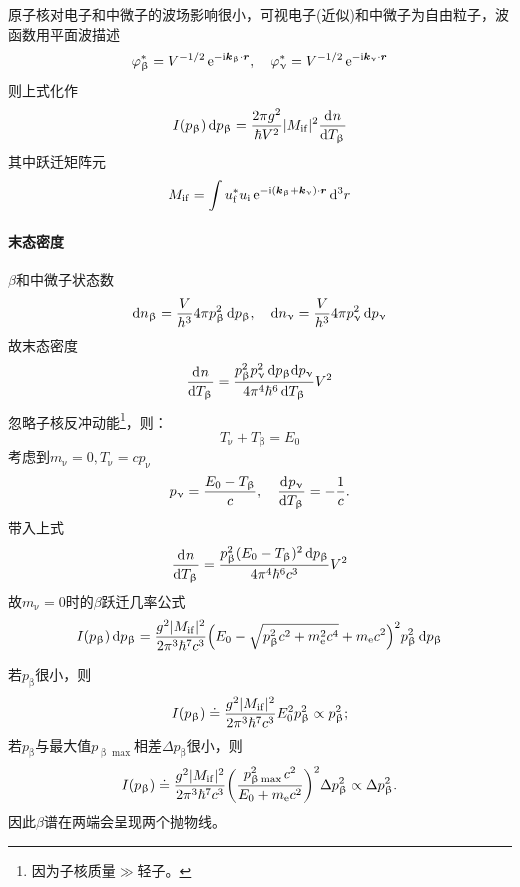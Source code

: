 原子核对电子和中微子的波场影响很小，可视电子(近似)和中微子为自由粒子，波函数用平面波描述
\[
	\varphi_\upbeta^\ast = V^{-1/2}\mathop{}\!\mathrm{e}^{-\mathrm{i}\bm k_\upbeta\cdot\bm r},\quad\varphi_\upnu^\ast = V^{-1/2}\mathop{}\!\mathrm{e}^{-\mathrm{i}\bm k_\upnu\cdot\bm r}
\]
则上式化作
\[
	I(p_\upbeta)\mathop{}\!\mathrm{d} p_\upbeta = \frac{2\pi g^2}{\hbar V^2}\lvert M_{\mathrm i\mathrm f}\rvert^2\frac{\mathop{}\!\mathrm{d}^{}n}{\mathrm{d}{T_\upbeta}^{}}
\]
其中跃迁矩阵元
\begin{align}\label{transition matrix element}
	M_{\mathrm i\mathrm f} = \int u_\mathrm f^\ast u_\mathrm i\mathop{}\!\mathrm{e}^{-\mathrm{i}(\bm k_\upbeta+\bm k_\upnu)\cdot\bm r}\mathop{}\!\mathrm{d}^3r
\end{align}

\paragraph{末态密度}$\beta$和中微子状态数
\[
	\mathop{}\!\mathrm{d} n_\upbeta = \frac V{h^3}4\pi p_\upbeta^2\mathop{}\!\mathrm{d} p_\upbeta,\quad \mathop{}\!\mathrm{d} n_\upnu = \frac V{h^3}4\pi p_\upnu^2\mathop{}\!\mathrm{d} p_\upnu
\]
故末态密度
\begin{equation}\label{eq:nrd-beta-final-state-density}
	\frac{\mathop{}\!\mathrm{d}^{}n}{\mathrm{d}{T_\upbeta}^{}} = \frac{p_\upbeta^2p_\upnu^2\mathop{}\!\mathrm{d} p_\upbeta\mathrm{d} p_\upnu}{4\pi^4\hbar^6\mathop{}\!\mathrm{d} T_\upbeta}V^2
\end{equation}
忽略子核反冲动能\footnote{因为子核质量$\gg$轻子。}，则：
\[
	T_\upnu + T_\upbeta = E_0
\]
考虑到$m_\upnu = 0,T_\upnu = cp_\upnu$
\[
	p_\upnu = \frac{E_0 - T_\upbeta}c,\quad\frac{\mathop{}\!\mathrm{d}^{}p_\upnu}{\mathrm{d}{T_\upbeta}^{}} = -\frac1c.
\]
带入上式
\[
	\frac{\mathop{}\!\mathrm{d}^{}n}{\mathrm{d}{T_\upbeta}^{}} = \frac{p_\upbeta^2(E_0 - T_\upbeta)^2\mathop{}\!\mathrm{d} p_\upbeta}{4\pi^4\hbar^6c^3}V^2
\]
故$m_\upnu = 0$时的$\beta$跃迁几率公式
\begin{align}\label{beta-decay Prob}
	I(p_\upbeta)\mathop{}\!\mathrm{d} p_\upbeta = \frac{g^2\lvert M_{\mathrm i\mathrm f}\rvert^2}{2\pi^3\hbar^7c^3}\Bigl(E_0 - \sqrt{p_\upbeta^2c^2 + m_{\mathrm{e}}^2c^4} + m_{\mathrm{e}} c^2\Bigr)^2p_\upbeta^2\mathop{}\!\mathrm{d} p_\upbeta
\end{align}
\begin{notecaptionblock}
\end{notecaptionblock}
若$p_\upbeta$很小，则
\[
	I(p_\upbeta) \doteq \frac{g^2\lvert M_{\mathrm i\mathrm f}\rvert^2}{2\pi^3\hbar^7c^3}E_0^2p_\upbeta^2 \propto p_\upbeta^2;
\]
若$p_\upbeta$与最大值$p_{\upbeta\max{}}$相差$\Delta p_\upbeta$很小，则
\[
	I(p_\upbeta) \doteq \frac{g^2\lvert M_{\mathrm i\mathrm f}\rvert^2}{2\pi^3\hbar^7c^3}\biggl(\frac{p_{\upbeta\max{}}^2c^2}{E_0 + m_{\mathrm{e}} c^2}\biggr)^2\Delta p_\upbeta^2 \propto \Delta p_\upbeta^2.
\]
因此$\beta$谱在两端会呈现两个抛物线。

